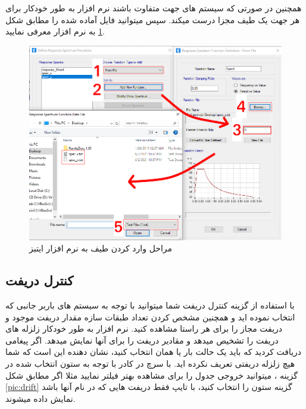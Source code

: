 همچنین در صورتی که سیستم های جهت 
متفاوت باشند نرم افزار به طور خودکار برای هر جهت یک طیف مجزا درست میکند. سپس میتوانید فایل آماده شده را مطابق شکل
\ref{pic:spec}
به نرم افزار معرفی نمایید.

\begin{figure}[H]
    \centering
    \includegraphics[scale=.6]{figures/spec}
    \caption{مراحل وارد کردن طیف به نرم افزار ایتبز}
    \label{pic:spec}
\end{figure}

\subsection{کنترل دریفت}
با استفاده از گزینه کنترل دریفت شما میتوانید با توجه به سیستم های باربر جانبی که انتخاب نموده اید و همچنین مشخص کردن تعداد طبقات سازه مقدار دریفت موجود و دریفت مجاز را برای هر راستا مشاهده کنید.
نرم افزار به طور خودکار زلزله های دریفت را تشخیص میدهد و مقادیر دریفت را برای آنها نمایش میدهد.  اگر پیغامی دریافت کردید که باید یک حالت بار یا همان 
انتخاب کنید، نشان دهنده این است که شما هیچ زلزله دریفتی تعریف نکرده اید.
با سرچ در کادر 
با توجه به ستون انتخاب شده در گزینه 
، میتوانید خروجی جدول را برای مشاهده بهتر فیلتر نمایید مثلا اگر مطابق شکل
\ref{pic:drift}
گزینه ستون را
انتخاب کنید، با تایپ 
فقط دریفت هایی که در نام آنها  باشد نمایش داده میشوند.

